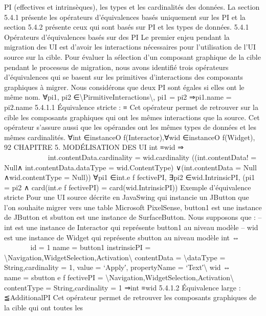 \documentclass{article}
\begin{document}
PI (effectives et intrins\`{e}ques), les types et les cardinalit\'{e}s des donn\'{e}es.
La section 5.4.1 pr\'{e}sente les op\'{e}rateurs d’\'{e}quivalences bas\'{e}s uniquement sur les PI et la section 5.4.2 pr\'{e}sente ceux qui sont bas\'{e}s sur PI et les types de donn\'{e}es.
5.4.1
Op\'{e}rateurs d’\'{e}quivalences bas\'{e}s sur des PI
Le premier enjeu pendant la migration des UI est d’avoir les interactions n\'{e}cessaires pour l’utilisation de l’UI source sur la cible. Pour \'{e}valuer la s\'{e}lection d’un composant graphique de la cible
pendant le processus de migration, nous avons identiﬁ\'{e} trois op\'{e}rateurs d’\'{e}quivalences qui se basent
sur les primitives d’interactions des composants graphiques \`{a} migrer.
Nous consid\'{e}rons que deux PI sont \'{e}gales si elles ont le m\^{e}me nom.
∀pi1, pi2 ∈\textbackslash{}{PirmitiveInteractions\textbackslash{}},
pi1 = pi2 ⇒pi1.name = pi2.name
5.4.1.1
Équivalence stricte : ≡
Cet op\'{e}rateur permet de retrouver sur la cible les composants graphiques qui ont les m\^{e}mes interactions que la source. Cet op\'{e}rateur s’assure aussi que les op\'{e}randes ont les m\^{e}mes types de donn\'{e}es
et les m\^{e}mes cardinalit\'{e}s.
∀int ∈instanceO f(Interactor),∀wid ∈instanceO f(Widget),
92
CHAPITRE 5. MODÉLISATION DES UI
int ≡wid ⇒



























int.contentData.cardinality = wid.cardinality
((int.contentData! = Null∧
int.contentData.dataType = wid.ContentType)
∨(int.contentData = Null ∧wid.contentType = Null))
∀pi1 ∈int.e f fectivePI,
∃pi2 ∈wid.IntrinsicPI,
(pi1 = pi2
∧
card(int.e f fectivePI) = card(wid.IntrinsicPI))
Exemple d’\'{e}quivalence stricte
Pour une UI source d\'{e}crite en JavaSwing qui instancie un JButton
que l’on souhaite migrer vers une table Microsoft PixelSense, button1 est une instance de JButton et
sbutton est une instance de SurfaceButton. Nous supposons que :
– int est une instance de Interactor qui repr\'{e}sente button1 au niveau mod\`{e}le
– wid est une instance de Widget qui repr\'{e}sente sbutton au niveau mod\`{e}le
int ⇔











id = 1
name = button1
instrinsicPI = \textbackslash{}{Navigation,WidgetSelection,Activation\textbackslash{}}
contentData = \textbackslash{}{dataType = String,cardinality = 1,
value = ‘Apply′, propertyName = ‘Text′\textbackslash{}}
wid ⇔



name = sbutton
e f fectivePI = \textbackslash{}{Navigation,WidgetSelection,Activation\textbackslash{}}
contentType = String,cardinality = 1
⇒int ≡wid
5.4.1.2
Équivalence large : ≦AdditionalPI
Cet op\'{e}rateur permet de retrouver les composants graphiques de la cible qui ont toutes les
\end{document}
